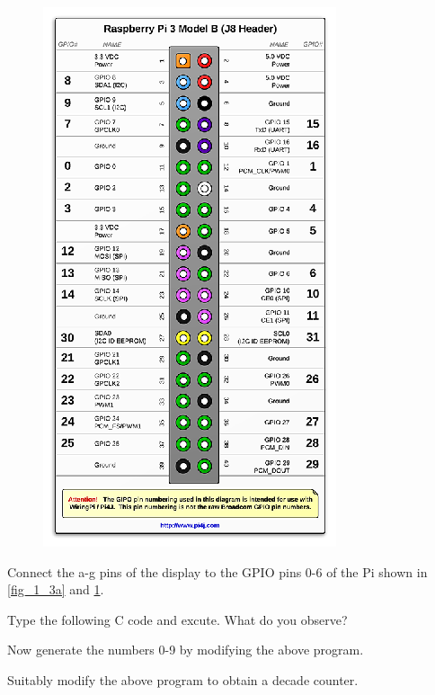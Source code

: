 \begin{figure}
\begin{center}
\includegraphics[width=\columnwidth]{./figs/gpio1}
\end{center}
\label{fig_1_3b}	
\end{figure}
\renewcommand{\thefigure}{\theproblem}
\begin{problem}
Connect the a-g pins of the display to the GPIO pins 0-6 of the Pi shown in \ref{fig_1_3a} and \ref{fig_1_3b}.
\end{problem}
\begin{problem}
Type the following C code and excute. What do you observe?
\end{problem}
\solution

\begin{problem}
Now generate the numbers 0-9 by modifying the above program.
\end{problem}
\begin{problem}
Suitably modify the above program to obtain a decade counter.
\end{problem}


